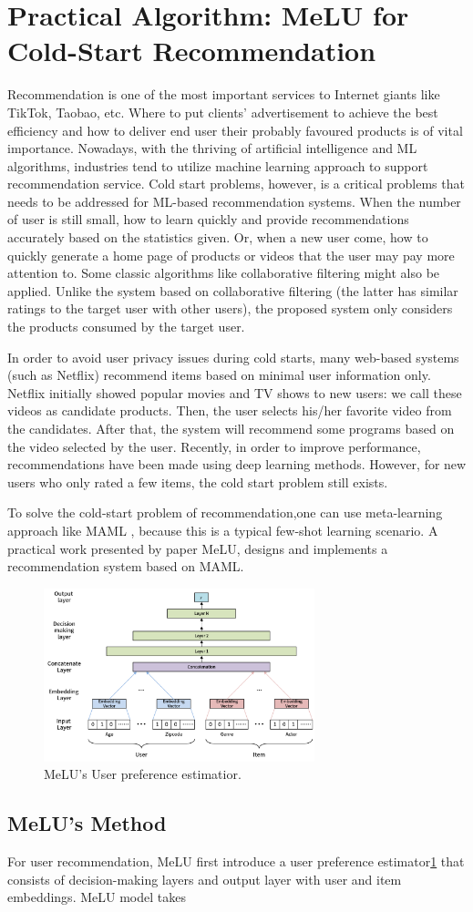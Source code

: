 \section{Practical Algorithm: MeLU for Cold-Start Recommendation}

Recommendation is one of the most important services to Internet giants like TikTok, Taobao, etc. Where to put clients' advertisement to achieve the best efficiency and how to deliver end user their probably favoured products is of vital importance. Nowadays, with the thriving of artificial intelligence and ML algorithms, industries tend to utilize machine learning approach to support recommendation service. Cold start problems, however, is a critical problems that needs to be addressed for ML-based recommendation systems. When the number of user is still small, how to learn quickly and  provide recommendations accurately based on the statistics given. Or, when a new user come, how to quickly generate a home page of products or videos that the user may pay more attention to. Some classic algorithms like collaborative filtering might also be applied. Unlike the system based on collaborative filtering (the latter has similar ratings to the target user with other users), the proposed system only considers the products consumed by the target user.

In order to avoid user privacy issues during cold starts, many web-based systems (such as Netflix) recommend items based on minimal user information only. Netflix initially showed popular movies and TV shows to new users: we call these videos as candidate products. Then, the user selects his/her favorite video from the candidates. After that, the system will recommend some programs based on the video selected by the user. Recently, in order to improve performance, recommendations have been made using deep learning methods. However, for new users who only rated a few items, the cold start problem still exists.

To solve the cold-start problem of recommendation,one can use meta-learning approach like MAML , because this is a typical few-shot learning scenario. A practical work presented by paper MeLU\cite{lee2019melu}, designs and implements a recommendation system based on MAML. 


\begin{figure}[H] 
    \centering 
    \includegraphics[width=0.7\textwidth]{image/MeLU-arch.png} 
    \caption{MeLU's User preference estimatior.}
    \label{fig:melu-estimator} 
\end{figure}

\subsection{MeLU's Method}
For user recommendation, MeLU first introduce a user preference estimator\ref{fig:melu-estimator} that consists of decision-making layers and output layer with user and item embeddings. MeLU model takes 

